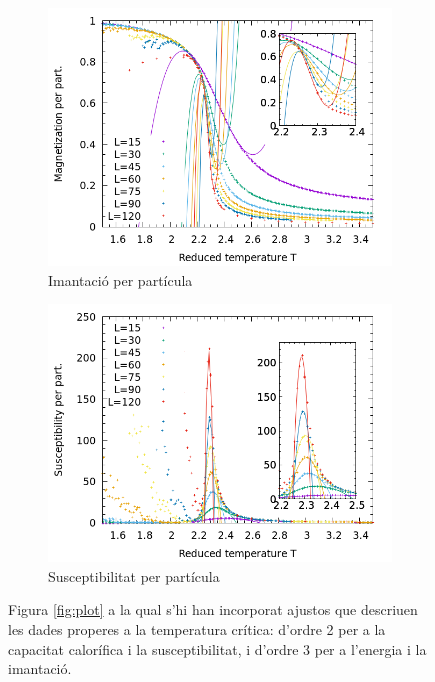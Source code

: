 \documentclass[a4paper]{article}
\begin{document}
\begin{figure}[H]
\begin{subfigure}{.45\textwidth}
        \includegraphics[width=\textwidth]{plot-m-fit.png}
        \caption{Imantació per partícula}
        \label{fig:fit-m}
    \end{subfigure}
    \begin{subfigure}{.45\textwidth}
        \centering
        \includegraphics[width=\textwidth]{plot-x-fit.png}
        \caption{Susceptibilitat per partícula}
        \label{fig:fit-x}
    \end{subfigure}
    \caption{Figura \ref{fig:plot} a la qual s'hi han incorporat ajustos que descriuen les dades properes a la temperatura crítica: d'ordre 2 per a la capacitat calorífica i la susceptibilitat, i d'ordre 3 per a l'energia i la imantació.}
\label{fig:fit}
\end{figure}
\end{document}
